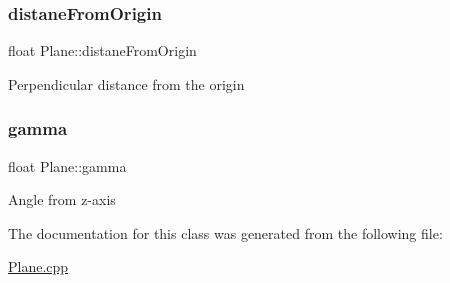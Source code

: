 \subsubsection{\texorpdfstring{distane\+From\+Origin}{distaneFromOrigin}}
{\footnotesize\ttfamily float Plane\+::distane\+From\+Origin}

Perpendicular distance from the origin \mbox{\label{class_plane_a5f227a19874cd026ad2027a42749448b}} 
\subsubsection{\texorpdfstring{gamma}{gamma}}
{\footnotesize\ttfamily float Plane\+::gamma}

Angle from z-\/axis 

The documentation for this class was generated from the following file\+:\begin{DoxyCompactItemize}
\item 
\hyperlink{_plane_8cpp}{Plane.\+cpp}\end{DoxyCompactItemize}
